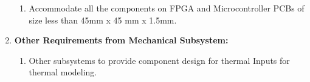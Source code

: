 \documentclass[../../main.tex]{subfiles}
\begin{document}
\begin{enumerate}
\begin{enumerate}
        \item Accommodate all the components on FPGA and Microcontroller PCBs of size less than 45mm x 45 mm x 1.5mm.
    \end{enumerate}
    \item \textbf{Other Requirements from Mechanical Subsystem:}
    \begin{enumerate}
        \item Other subsystems to provide component design for thermal Inputs for thermal modeling.
    \end{enumerate}

\end{enumerate}
\end{document}
